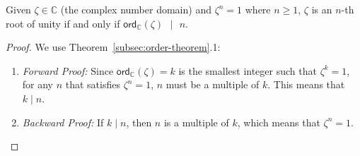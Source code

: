 \begin{tcolorbox}[title={\textbf{\tboxtheorem{\ref*{subsec:roots-theorem}.2} Order of the Root of Unity}}]
Given $\zeta \in \mathbb{C}$ (the complex number domain) and $\zeta^n = 1$ where $n \geq 1$, $\zeta$ is an $n$-th root of unity if and only if $\textsf{ord}_{\mathbb{C}}(\zeta) \text{ } | \text{ } n$.
\end{tcolorbox}
\begin{proof}
    We use 
    Theorem~\ref*{subsec:order-theorem}.1:
    \begin{enumerate}
    \item \textit{Forward Proof:} Since $\textsf{ord}_{\mathbb{C}}(\zeta)=k$ is the smallest integer such that $\zeta^k = 1$, for any $n$ that satisfies $\zeta^n = 1$, $n$ must be a multiple of $k$. This means that $k \mid n$.
    \item \textit{Backward Proof:} If $k \mid n$, then $n$ is a multiple of $k$, which means that $\zeta^n = 1$. 
    \end{enumerate}
\end{proof}


